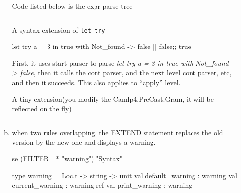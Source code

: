 \begin{enumerate}[(a)]
\begin{enumerate}[(a)]
Code listed below  is the expr parse tree
\inputminted{ocaml}{camlp4/code/expr_parse_tree.ml}


A syntax extension of \verb|let try|
\begin{alternate}
let try a = 3 in true with Not_found -> false || false;;
true  
\end{alternate}

First, it uses start parser to parse \textit{let try a = 3 in true
  with Not\_found -> false}, then it calls the cont parser, and the
next level cont parser, etc, and then it succeeds. This also applies
to ``apply'' level.


A tiny extension(you modify the Camlp4.PreCast.Gram, it will be
reflected on the fly)
\inputminted{ocaml}{camlp4/code/syntax_extension_a.ml}

\item when two rules overlapping, the EXTEND statement replaces the
    old version by the new one and displays a warning. 

\begin{redcode}
se (FILTER _* "warning") "Syntax"
\end{redcode}
\begin{bluecode}
type warning = Loc.t -> string -> unit
val default_warning : warning
val current_warning : warning ref
val print_warning : warning
\end{bluecode}
  

  \end{enumerate}

\end{enumerate}


